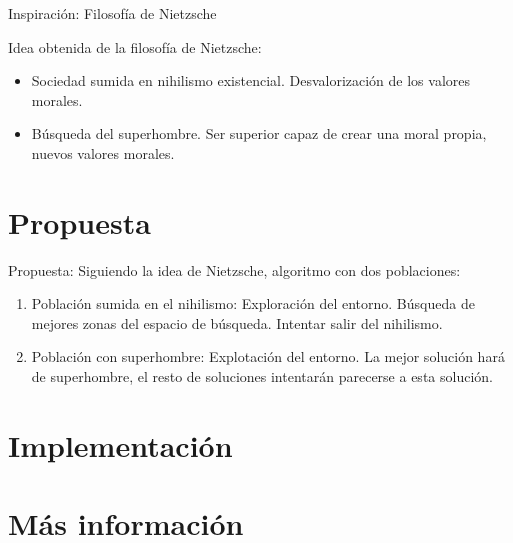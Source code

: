 \documentclass{beamer}
\begin{document}
\begin{frame}{Inspiración: Filosofía de Nietzsche}
\begin{minipage}{0.3\textwidth}
\begin{figure}
    	\end{figure}
    	
    \end{minipage}
    \hfill
	\begin{minipage}{0.6\textwidth}	
    	Idea obtenida de la filosofía de Nietzsche:
    
    	\begin{itemize}
			\item Sociedad sumida en nihilismo existencial. Desvalorización de los valores morales.
			\item Búsqueda del superhombre. Ser superior capaz de crear una moral propia, nuevos valores morales.
    	\end{itemize}
	\end{minipage}
	
\end{frame}
  
  
  
\section{Propuesta}
  
\begin{frame}{Propuesta:}
Siguiendo la idea de Nietzsche, algoritmo con dos poblaciones:

\begin{enumerate}
	\item Población sumida en el nihilismo: Exploración del entorno. Búsqueda de mejores zonas del espacio de búsqueda. Intentar salir del nihilismo.
	\item Población con superhombre: Explotación del entorno. La mejor solución hará de superhombre, el resto de soluciones intentarán parecerse a esta solución.
\end{enumerate}

\end{frame}  
  
  
  
\section{Implementación}
  
\section{Más información}
  
\end{document}
